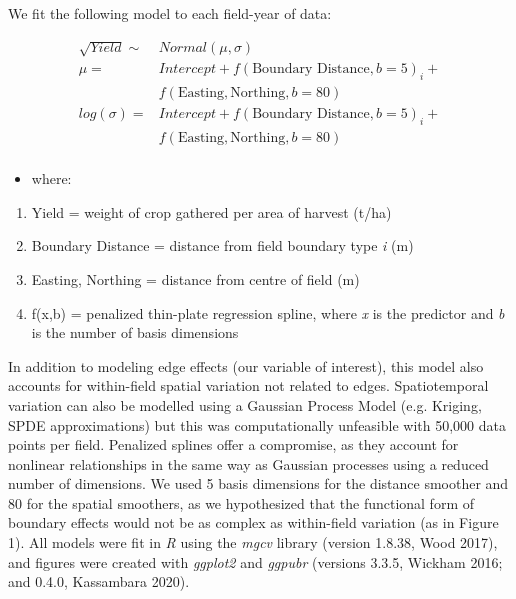 \documentclass[]{elsarticle} %
\providecommand{\tightlist}{%
  \setlength{\itemsep}{0pt}\setlength{\parskip}{0pt}}
\begin{document}
We fit the following model to each field-year of data:

\begin{equation}
  \begin{split}
  \sqrt{Yield} \sim & Normal (\mu, \sigma)\\
  \mu = & Intercept + f(\text{Boundary Distance}, b=5)_i + \\
   & f(\text{Easting}, \text{Northing}, b=80)\\
  log(\sigma) =  & Intercept + f(\text{Boundary Distance}, b=5)_i + \\
   & f(\text{Easting}, \text{Northing}, b=80)\\
  \end{split}
  \end{equation}

\begin{itemize}
\tightlist
\item
  where:
\end{itemize}

\begin{enumerate}
\def\labelenumi{\arabic{enumi}.}
\tightlist
\item Yield = weight of crop gathered per area of harvest (t/ha)
\item Boundary Distance = distance from field boundary type \emph{i} (m)
\item Easting, Northing = distance from centre of field (m)
\item f(x,b) = penalized thin-plate regression spline, where \emph{x} is the predictor and \emph{b} is the number of basis dimensions
\end{enumerate}

In addition to modeling edge effects (our variable of interest), this model also accounts for within-field spatial variation not related to edges.
Spatiotemporal variation can also be modelled using a Gaussian Process Model (e.g. Kriging, SPDE approximations) but this was computationally unfeasible with 50,000 data points per field.
Penalized splines offer a compromise, as they account for nonlinear relationships in the same way as Gaussian processes using a reduced number of dimensions.
We used 5 basis dimensions for the distance smoother and 80 for the spatial smoothers, as we hypothesized that the functional form of boundary effects would not be as complex as within-field variation (as in Figure 1).
All models were fit in \emph{R} using the \emph{mgcv} library (version 1.8.38, Wood 2017), and figures were created with \emph{ggplot2} and \emph{ggpubr} (versions 3.3.5, Wickham 2016; and 0.4.0, Kassambara 2020).
\end{document}
